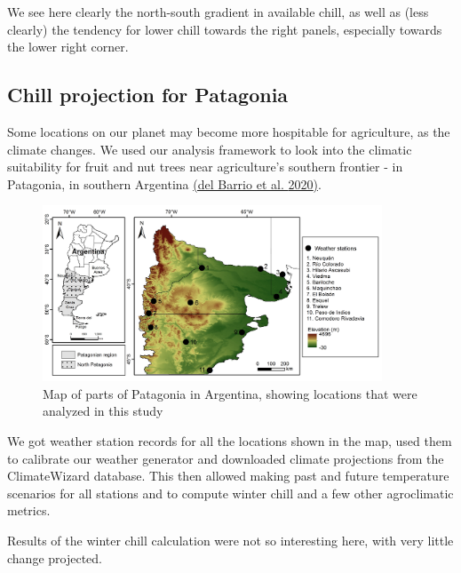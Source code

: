 \documentclass[
]{book}
\begin{document}
We see here clearly the north-south gradient in available chill, as well as (less clearly) the tendency for lower chill towards the right panels, especially towards the lower right corner.

\hypertarget{chill-projection-for-patagonia}{%
\subsection{Chill projection for Patagonia}\label{chill-projection-for-patagonia}}

Some locations on our planet may become more hospitable for agriculture, as the climate changes. We used our analysis framework to look into the climatic suitability for fruit and nut trees near agriculture's southern frontier - in Patagonia, in southern Argentina \href{https://rmets.onlinelibrary.wiley.com/doi/pdf/10.1002/joc.6649}{(del Barrio et al. \protect\hyperlink{ref-delclimate}{2020})}.

\begin{figure}
\centering
\includegraphics[width=0.9\textwidth,height=\textheight]{pictures/Patagonia_map.png}
\caption{Map of parts of Patagonia in Argentina, showing locations that were analyzed in this study}
\end{figure}

We got weather station records for all the locations shown in the map, used them to calibrate our weather generator and downloaded climate projections from the ClimateWizard database. This then allowed making past and future temperature scenarios for all stations and to compute winter chill and a few other agroclimatic metrics.

Results of the winter chill calculation were not so interesting here, with very little change projected.
\end{document}
